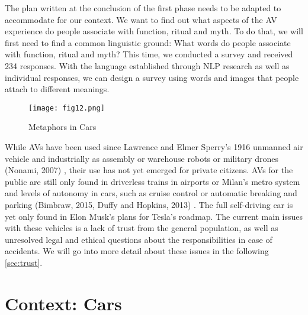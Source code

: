 \documentclass[12pt, usenames, dvipsnames]{report}
\begin{document}
\begin{flushleft}
The plan written at the conclusion of the first phase needs to be adapted to accommodate for our context. 
We want to find out what aspects of the AV experience do people associate with function, ritual and myth. 
To do that, we will first need to find a common linguistic ground:
What words do people associate with function, ritual and myth?
This time, we conducted a survey and received 234 responses. 
With the language established through NLP research as well as individual responses, we can design a survey using words and images that people attach to different meanings.

\vspace*{1.2em}
\begin{figure}[!htbp]
  \hspace*{-3.666em}
  \texttt{[image: fig12.png]}
  \caption{Metaphors in Cars}
  \label{fig:figure12}
\end{figure}
\vspace*{1.2em}

While AVs have been used since Lawrence and Elmer Sperry's 1916 unmanned air vehicle and industrially as assembly or warehouse robots or military drones (Nonami, 2007) \cite{nonami2007}, their use has not yet emerged for private citizens.
AVs for the public are still only found in driverless trains in airports or Milan's metro system and levels of autonomy in cars, such as cruise control or automatic breaking and parking (Bimbraw, 2015, Duffy and Hopkins, 2013) \cite{bimbraw2015} \cite{duffy2013}. %
The full self-driving car is yet only found in Elon Musk's plans for Tesla's roadmap.
The current main issues with these vehicles is a lack of trust from the general population, as well as unresolved legal and ethical questions about the responsibilities in case of accidents. 
We will go into more detail about these issues in the following \autoref{sec:trust}.



\section{Context: Cars}


\end{flushleft}
\end{document}
